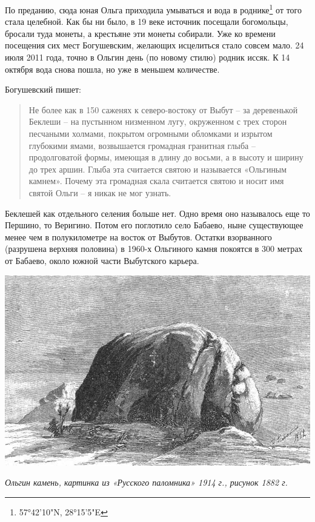 По преданию, сюда юная Ольга приходила умываться и вода в роднике\footnote{57°42'10"N, 28°15'5"E} от того стала целебной. Как бы ни было, в 19 веке источник посещали богомольцы, бросали туда монеты, а крестьяне эти монеты собирали. Уже ко времени посещения сих мест Богушевским, желающих исцелиться стало совсем мало. 24 июля 2011 года, точно в Ольгин день (по новому стилю) родник иссяк. К 14 октября вода снова пошла, но уже в меньшем количестве.

Богушевский пишет:

\begin{quotation}
Не более как в 150 саженях к северо-востоку от Выбут – за деревенькой Беклеши – на пустынном низменном лугу, окруженном с трех сторон песчаными холмами, покрытом огромными обломками и изрытом глубокими ямами, возвышается громадная гранитная глыба – продолговатой формы, имеющая в длину до восьми, а в высоту и ширину до трех аршин. Глыба эта считается святою и называется «Ольгиным камнем». Почему эта громадная скала считается святою и носит имя святой Ольги – я никак не мог узнать.
\end{quotation}

Беклешей как отдельного селения больше нет. Одно время оно называлось еще то Першино, то Веригино. Потом его поглотило село Бабаево, ныне существующее менее чем в полукилометре на восток от Выбутов. Остатки взорванного (разрушена верхняя половина) в 1960-х Ольгиного камня покоятся в 300 метрах от Бабаево, около южной части Выбутского карьера.

\begin{center}
\includegraphics[width=\linewidth]{chast-volga/vybuty/vybuty-olgin-kamen.jpg}

\textit{Ольгин камень, картинка из «Русского паломника» 1914 г., рисунок 1882 г.}
\end{center}

